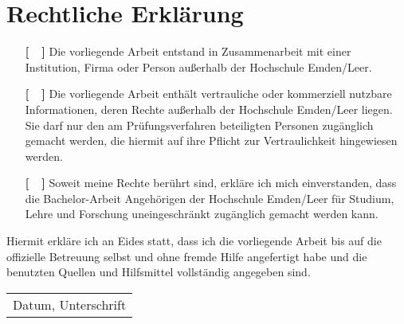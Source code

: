 %
\chapter*{Rechtliche Erklärung}
\label{sec:Declaration} %
%
\vspace{1.5cm}
\begin{itemize}
\item[ {\bf [~~]} ] Die vorliegende Arbeit entstand in Zusammenarbeit mit einer In\-sti\-tution, Firma oder Person außerhalb der Hochschule Emden/Leer.

\item[ {\bf [~~]} ] Die vorliegende Arbeit enthält vertrauliche oder kommerziell nutzbare Informationen, deren Rechte außerhalb der Hochschule Emden/Leer liegen. Sie darf nur den am Prüfungs\-verfahren beteiligten Personen zugänglich gemacht werden, die hiermit auf ihre Pflicht zur Vertraulichkeit hingewiesen werden.

\item[ {\bf [~~]} ] Soweit meine Rechte berührt sind, erkläre ich mich einverstanden, dass die Bachelor-Arbeit Angehörigen der Hochschule Emden/Leer für Studium, Lehre und Forschung uneingeschränkt zugänglich gemacht werden kann. 

\end{itemize}
%
\vspace{2.0cm}

Hiermit erkläre ich an Eides statt, dass ich die vorliegende Arbeit bis auf die offizielle Betreuung selbst und ohne fremde Hilfe angefertigt habe und die benutzten Quellen und Hilfsmittel vollständig angegeben sind.

\vspace{2.0cm}

\begin{tabular}{p{5.0cm}}
   \hline
   Datum, Unterschrift
\end{tabular}
